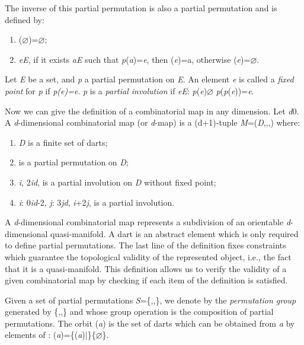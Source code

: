 The inverse \pinv{} of this partial permutation is also a partial
permutation and is defined by:
\begin{enumerate}
\item \pinv{}($\varnothing$)=$\varnothing$;
\item \myforall{}\emph{e}\myin{}\emph{E}, if it exists \emph{a}\myin{}\emph{E} such that 
  \emph{p}(\emph{a})=\emph{e},
  then \pinv{}(\emph{e})=a, otherwise \pinv{}(\emph{e})=$\varnothing$.
\end{enumerate}

Let \emph{E} be a set, and \emph{p} a partial permutation on \emph{E}.  An element
\emph{e} is called a \emph{fixed point} for \emph{p} if \emph{p(e)=e}.  \emph{p} is a
\emph{partial involution} if \myforall{}\emph{e}\myin{}\emph{E}: \emph{p}(\emph{e})\myneq{}$\varnothing$
\myRightarrow{} \emph{p}(\emph{p}(\emph{e}))=\emph{e}.

Now we can give the definition of a combinatorial map in any dimension.
Let \emph{d}\mygeq{}0. A \emph{d}-dimensional combinatorial map (or 
\emph{d}-map) is a (d+1)-tuple \emph{M}=(\emph{D},\betaun{},\myldots{},\betad{}) 
where:
\begin{enumerate}
\item \emph{D} is a finite set of darts;
\item \betaun{} is a partial permutation on \emph{D};
\item \myforall{}\emph{i}, 2\myleq{}\emph{i}\myleq{}\emph{d}, \betai{} is a
  partial involution on \emph{D} without fixed point;
\item\label{cond-composition} \myforall{}\emph{i}: 0\myleq{}\emph{i}\myleq{}\emph{d}-2,
  \myforall{}\emph{j}: 3\myleq{}\emph{j}\myleq{}\emph{d}, \emph{i}+2\myleq{}\emph{j},
  \betai{}\comp{}\betaj{} is a partial involution.
\end{enumerate}

A \emph{d}-dimensional combinatorial map represents a subdivision of an
orientable \emph{d}-dimensional quasi-manifold. A dart is an abstract element
which is only required to define partial permutations. The last line of
the definition fixes constraints which guarantee the topological
validity of the represented object, i.e., the fact that it is a
quasi-manifold. This definition allows us to verify the validity of a
given combinatorial map by checking if each item of the definition is
satisfied.

Given a set of partial permutations 
\emph{S}=\{,\myldots{},\}, 
we denote by  the \emph{permutation group} generated by
\{,\myldots{},\} 
and whose group operation is the composition of partial permutations.  
The orbit (\emph{a}) 
is the set of darts which can be obtained from \emph{a} by elements of :
(\emph{a})=\{\myphi{}(\emph{a})$|$\myphi{}\myin{}\}\mysetminus{}\{$\varnothing$\}.

